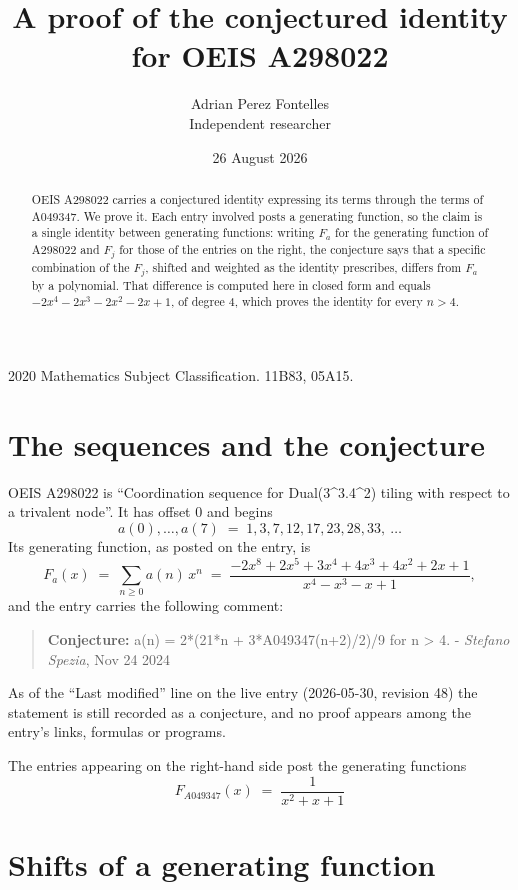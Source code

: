 \documentclass[11pt,a4paper]{article}
\title{A proof of the conjectured identity for OEIS A298022}
\author{Adrian Perez Fontelles\\ \small Independent researcher}
\date{26 August 2026}
\theoremstyle{plain}
\theoremstyle{definition}
\begin{document}
\maketitle

\begin{abstract}
OEIS A298022 carries a conjectured identity expressing its terms through the terms of
A049347. We prove it. Each entry involved posts a generating function, so the claim is
a single identity between generating functions: writing $F_{a}$ for the generating
function of A298022 and $F_{j}$ for those of the entries on the right, the conjecture
says that a specific combination of the $F_{j}$, shifted and weighted as the identity
prescribes, differs from $F_{a}$ by a polynomial. That difference is computed here in
closed form and equals $- 2 x^{4} - 2 x^{3} - 2 x^{2} - 2 x + 1$, of degree $4$, which proves the identity for
every $n>4$.
\end{abstract}

\noindent\small 2020 Mathematics Subject Classification. 11B83, 05A15.\normalsize

\section{The sequences and the conjecture}

OEIS A298022 is ``Coordination sequence for Dual(3\^{}3.4\^{}2) tiling with respect to a trivalent node''. It has offset $0$ and begins
\[
a(0),\dots,a(7)\;=\;1, 3, 7, 12, 17, 23, 28, 33,\ \dots
\]
Its generating function, as posted on the entry, is
\begin{equation}\label{eq:gf}
F_{a}(x)\;=\;\sum_{n\ge 0} a(n)\,x^{n}\;=\;\frac{- 2 x^{8} + 2 x^{5} + 3 x^{4} + 4 x^{3} + 4 x^{2} + 2 x + 1}{x^{4} - x^{3} - x + 1} ,
\end{equation}
and the entry carries the following comment:
\begin{quote}\small
\textbf{Conjecture:} a(n) = 2*(21*n + 3*A049347(n+2)/2)/9 for n > 4. - \emph{Stefano Spezia}, Nov 24 2024
\end{quote}
As of the ``Last modified'' line on the live entry (2026-05-30, revision 48) the
statement is still recorded as a conjecture, and no proof appears among the entry's links,
formulas or programs.

The entries appearing on the right-hand side post the generating functions
\[
F_{A049347}(x) \;=\; \frac{1}{x^{2} + x + 1}
\]

\section{Shifts of a generating function}
\end{document}
